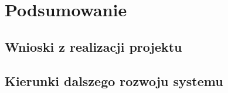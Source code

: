 \chapter{Podsumowanie}

\section{Wnioski z realizacji projektu}
\sectionanchor

\section{Kierunki dalszego rozwoju systemu}
\sectionanchor
